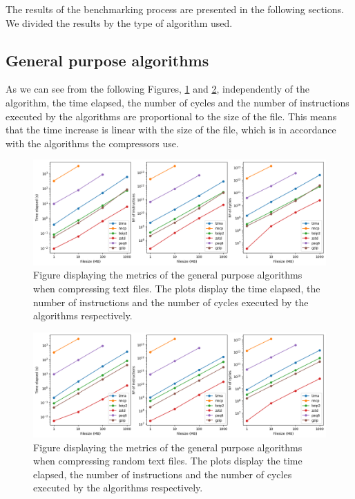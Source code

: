     The results of the benchmarking process are presented in the following sections. We divided the results by the type of algorithm used.

    \subsection{General purpose algorithms}

        As we can see from the following Figures, \ref{fig:text_stats} and \ref{fig:random_text_stats}, independently of the algorithm, the time elapsed, the number of cycles and the number of instructions executed by the algorithms are proportional to the size of the file. This means that the time increase is linear with the size of the file, which is in accordance with the algorithms the compressors use. 

        \begin{figure}[h]
            \centering
            \includegraphics[width=1\textwidth]{figs/text_stats.png}
            \caption[Figure displaying the metrics of the general purpose algorithms when compressing text files.] {Figure displaying the metrics of the general purpose algorithms when compressing text files. The plots display the time elapsed, the number of instructions and the number of cycles executed by the algorithms respectively.}
            \label{fig:text_stats}
        \end{figure}

        \begin{figure}[h]
            \centering
            \includegraphics[width=1\textwidth]{figs/random_text_stats.png}
            \caption[Figure displaying the metrics of the general purpose algorithms when compressing random text files.] {Figure displaying the metrics of the general purpose algorithms when compressing random text files. The plots display the time elapsed, the number of instructions and the number of cycles executed by the algorithms respectively.}
            \label{fig:random_text_stats}
        \end{figure}

